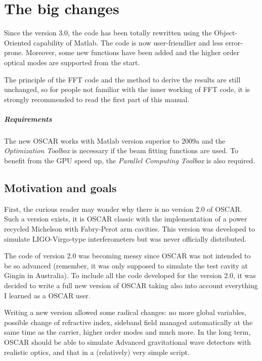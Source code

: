 

\chapter{The big changes}

Since the version 3.0, the code has been totally rewritten using the Object-Oriented capability of Matlab. The code is now user-friendlier and less error-prone. Moreover, some new functions have been added and the higher order optical modes are supported from the start.

The principle of the FFT code and the method to derive the results are still unchanged, so for people not familiar with the inner working of FFT code, it is strongly recommended to read the first part of this manual.

\paragraph{Requirements} The new OSCAR works with Matlab version superior to 2009a and the \textsl{Optimization Toolbox} is necessary if the beam fitting functions are used. To benefit from the GPU speed up, the \textsl{Parallel Computing Toolbox} is also required.

\section{Motivation and goals}

 First, the curious reader may wonder why there is no version 2.0 of OSCAR. Such a version exists, it is OSCAR classic with the implementation of a power recycled Michelson with Fabry-Perot arm cavities. This version was developed to simulate LIGO-Virgo-type interferometers but was never officially distributed.

 The code of version 2.0 was becoming messy since OSCAR was not intended to be so advanced (remember, it was only supposed to simulate the test cavity at Gingin in Australia). To include all the code developed for the version 2.0, it was decided to write a full new version of OSCAR taking also into account everything I learned as a OSCAR user.

 Writing a new version allowed some radical changes: no more global variables, possible change of refractive index, sideband field managed automatically at the same time as the carrier, higher order modes and much more. In the long term, OSCAR should be able to simulate Advanced gravitational wave detectors with realistic optics, and that in a (relatively) very simple script.

